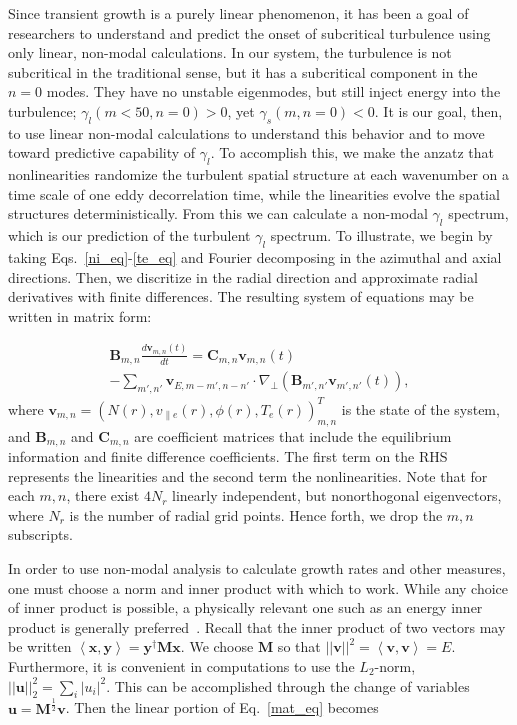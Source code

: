 \documentclass[letter,scriptaddress,twocolumn, prl,showkeys]{revtex4}
\def\beqar{\begin{eqnarray}}
\def\eeqar{\end{eqnarray}}
\newcommand{\diff}[2]{\frac{d#1}{d#2}}
\def\grad{\nabla}
\newcommand{\gradperp}{\grad_\perp}
\newcommand{\vpe}{v_{\parallel e}}
\begin{document}
Since transient growth is a purely linear phenomenon, it has been a goal of researchers to understand and predict the onset of subcritical turbulence using only linear, non-modal calculations. 
In our system, the turbulence is not subcritical in the traditional sense, but it has a subcritical component in the $n=0$ modes. They have no unstable eigenmodes, but still inject energy into the
turbulence; $\gamma_l(m<50,n=0) > 0$, yet $\gamma_s(m,n=0) < 0$. It is our goal, then, to use linear non-modal calculations to understand this behavior and to move toward predictive capability
of $\gamma_l$.
To accomplish this, we make the anzatz that nonlinearities randomize the turbulent spatial structure at each wavenumber on a time scale of 
one eddy decorrelation time, while the linearities evolve the spatial structures deterministically. From this we can calculate a non-modal $\gamma_l$ spectrum,
which is our prediction of the turbulent $\gamma_l$ spectrum. To illustrate,
we begin by taking Eqs.~\ref{ni_eq}-\ref{te_eq} and Fourier decomposing in the azimuthal and axial directions.  Then, we discritize in the radial direction and
approximate radial derivatives with finite differences.  The resulting system of equations may be written in matrix form:

\beqar
\label{mat_eq}
\mathbf{B}_{m,n} \diff{\mathbf{v}_{m,n}(t)}{t} = \mathbf{C}_{m,n} \mathbf{v}_{m,n}(t) \nonumber \\
- \sum_{m',n'}  \mathbf{v}_{E,m-m',n-n'} \cdot \gradperp \left( \mathbf{B}_{m',n'} \mathbf{v}_{m',n'}(t) \right),
\eeqar
where $\mathbf{v}_{m,n} = \left( N(r), \vpe(r), \phi(r), T_e(r) \right)_{m,n}^{T}$ is the state of the system,
and $\mathbf{B}_{m,n}$ and $\mathbf{C}_{m,n}$ are coefficient matrices that include the equilibrium information and finite difference coefficients. The first term on the RHS represents the linearities
and the second term the nonlinearities. Note that for each $m,n$, there exist $4 N_r$ linearly independent, but nonorthogonal eigenvectors, where $N_r$ is the number of radial grid points. 
Hence forth, we drop the $m,n$ subscripts.

In order to use non-modal analysis to calculate growth rates and other measures, one must choose a norm and inner product with which to work. While any choice of
inner product is possible, a physically relevant one such as an energy inner product is generally preferred~\cite{camargo1998,schmid2007,camporeale2010}. 
Recall that the inner product of two vectors may be written $\left< \mathbf{x},\mathbf{y} \right> = \mathbf{y}^{\dagger} \mathbf{M} \mathbf{x}$.
We choose $\mathbf{M}$ so that $||\mathbf{v}||^2 = \left< \mathbf{v},\mathbf{v} \right> = E$. Furthermore, it is convenient in
computations to use the $L_2$-norm, $||\mathbf{u}||_2^2 = \sum_i |u_i|^2$. This can be accomplished through the change of variables $\mathbf{u} = \mathbf{M}^{\frac{1}{2}} \mathbf{v}$.
Then the linear portion of Eq.~\ref{mat_eq} becomes
\end{document}
